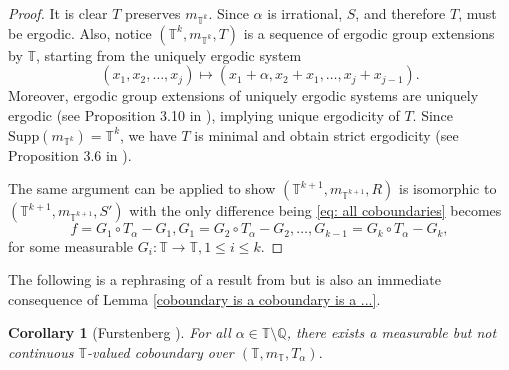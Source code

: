 \documentclass[12pt]{amsart}
\theoremstyle{definition}
\theoremstyle{plain}
\newtheorem{corollary}[theorem]{Corollary}
\theoremstyle{definition}
\newtheorem{remark}[theorem]{Remark}
\numberwithin{equation}{section}
\begin{document}
\begin{proof}
It is clear $T$ preserves $m_{\mathbb{T}^{k}}$. Since $\alpha$ is irrational, $S$, and therefore $T$, must be ergodic. Also, notice $(\mathbb{T}^{k},m_{\mathbb{T}^{k}},T)$ is a sequence of ergodic group extensions by $\mathbb{T}$, starting from the uniquely ergodic system $$(x_1,x_2,\dots,x_j)\mapsto(x_1+\alpha,x_2+x_1,\dots,x_j+x_{j-1}).$$ Moreover, ergodic group extensions of uniquely ergodic systems are uniquely ergodic (see Proposition 3.10 in \cite{Fur81}), implying unique ergodicity of $T$. Since $\mathrm{Supp}(m_{\mathbb{T}^{k}})=\mathbb{T}^{k}$, we have $T$ is minimal and obtain strict ergodicity (see Proposition 3.6 in \cite{Fur81}). 

The same argument can be applied to show $(\mathbb{T}^{k+1},m_{\mathbb{T}^{k+1}},R)$ is isomorphic to $(\mathbb{T}^{k+1},m_{\mathbb{T}^{k+1}},S')$ with the only difference being \eqref{eq: all coboundaries} becomes
\begin{equation}\label{eq: all coboundaries 2}
f=G_1 \circ T_\alpha -G_1, G_1=G_2 \circ T_\alpha-G_2,\dots, G_{k-1}=G_{k} \circ T_\alpha -G_{k},
\end{equation}
for some measurable $G_i\colon \mathbb{T} \rightarrow \mathbb{T}, 1 \leq i \leq k.$ \end{proof}

The following is a rephrasing of a result from \cite{Fur61} but is also an immediate consequence of Lemma \ref{coboundary is a coboundary is a ...}. 

\begin{corollary}[Furstenberg \cite{Fur61}] \label{meas but not continuous coboundaries always exists}
    For all $\alpha \in \mathbb{T} \setminus \mathbb{Q}$, there exists a measurable but not continuous $\mathbb{T}$-valued coboundary over $(\mathbb{T},m_{\mathbb{T}},T_{\alpha}).$ 
\end{corollary}

\end{document}
